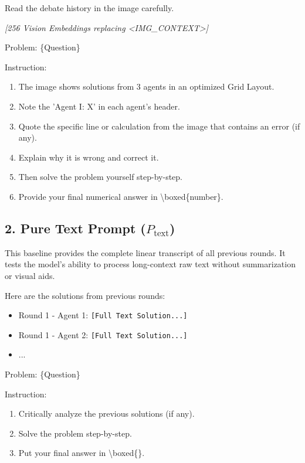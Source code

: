 \documentclass{article}
\theoremstyle{plain}
\theoremstyle{definition}
\theoremstyle{remark}
\begin{document}
\begin{tcolorbox}[colback=blue!5!white,colframe=blue!75!black,title=\textbf{Vision Prompt Template}]
\small\ttfamily
Read the debate history in the image carefully.

\vspace{0.2em}
\colorbox{blue!10}{\parbox{\linewidth}{\centering \textit{[256 Vision Embeddings replacing <IMG\_CONTEXT>]}}}
\vspace{0.2em}

Problem: \{Question\}

Instruction:
\begin{enumerate}[leftmargin=*,label=\arabic*.,noitemsep]
    \item The image shows solutions from 3 agents in an optimized Grid Layout.
    \item Note the 'Agent I: X' in each agent's header.
    \item Quote the specific line or calculation from the image that contains an error (if any).
    \item Explain why it is wrong and correct it.
    \item Then solve the problem yourself step-by-step.
    \item Provide your final numerical answer in \textbackslash boxed\{number\}.
\end{enumerate}
\end{tcolorbox}

\subsection{2. Pure Text Prompt ($P_{\text{text}}$)}
This baseline provides the complete linear transcript of all previous rounds. It tests the model's ability to process long-context raw text without summarization or visual aids.

\begin{tcolorbox}[colback=white,colframe=black,title=\textbf{Text-Only Prompt Template}]
\small\ttfamily
Here are the solutions from previous rounds:
\begin{itemize}[leftmargin=*,label={},noitemsep]
    \item Round 1 - Agent 1: \texttt{[Full Text Solution...]}
    \item Round 1 - Agent 2: \texttt{[Full Text Solution...]}
    \item ...
\end{itemize}

Problem: \{Question\}

Instruction:
\begin{enumerate}[leftmargin=*,label=\arabic*.,noitemsep]
    \item Critically analyze the previous solutions (if any).
    \item Solve the problem step-by-step.
    \item Put your final answer in \textbackslash boxed\{\}.
\end{enumerate}
\end{tcolorbox}
\end{document}
